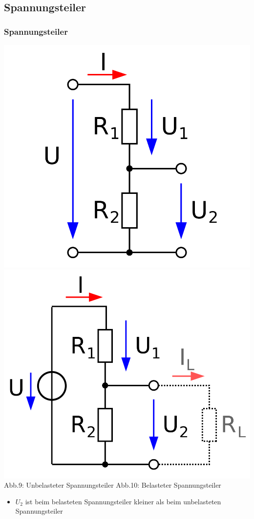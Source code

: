 \subsection{Spannungsteiler}
\begin{frame}
  \frametitle{Spannungsteiler}
  \includegraphics[scale=0.13]{a02/spannungsteiler-unbelastet.png}
  \hspace{2mm}
  \includegraphics[scale=0.13]{a02/spannungsteiler-belastet.png}\\
  {\tiny Abb.9: Unbelasteter Spannungsteiler \cite{wp}}
  \hspace{10mm}
  {\tiny Abb.10: Belasteter Spannungsteiler \cite{wp}}
  \begin{itemize}
    \item $U_2$ ist beim belasteten Spannungsteiler kleiner als beim unbelasteten Spannungsteiler
  \end{itemize}
\end{frame}

